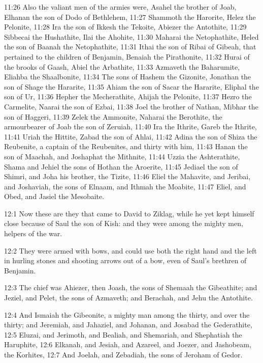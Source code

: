 11:26 Also the valiant men of the armies were, Asahel the brother of Joab, Elhanan the son of Dodo of Bethlehem, 11:27 Shammoth the Harorite, Helez the Pelonite, 11:28 Ira the son of Ikkesh the Tekoite, Abiezer the Antothite, 11:29 Sibbecai the Hushathite, Ilai the Ahohite, 11:30 Maharai the Netophathite, Heled the son of Baanah the Netophathite, 11:31 Ithai the son of Ribai of Gibeah, that pertained to the children of Benjamin, Benaiah the Pirathonite, 11:32 Hurai of the brooks of Gaash, Abiel the Arbathite, 11:33 Azmaveth the Baharumite, Eliahba the Shaalbonite, 11:34 The sons of Hashem the Gizonite, Jonathan the son of Shage the Hararite, 11:35 Ahiam the son of Sacar the Hararite, Eliphal the son of Ur, 11:36 Hepher the Mecherathite, Ahijah the Pelonite, 11:37 Hezro the Carmelite, Naarai the son of Ezbai, 11:38 Joel the brother of Nathan, Mibhar the son of Haggeri, 11:39 Zelek the Ammonite, Naharai the Berothite, the armourbearer of Joab the son of Zeruiah, 11:40 Ira the Ithrite, Gareb the Ithrite, 11:41 Uriah the Hittite, Zabad the son of Ahlai, 11:42 Adina the son of Shiza the Reubenite, a captain of the Reubenites, and thirty with him, 11:43 Hanan the son of Maachah, and Joshaphat the Mithnite, 11:44 Uzzia the Ashterathite, Shama and Jehiel the sons of Hothan the Aroerite, 11:45 Jediael the son of Shimri, and Joha his brother, the Tizite, 11:46 Eliel the Mahavite, and Jeribai, and Joshaviah, the sons of Elnaam, and Ithmah the Moabite, 11:47 Eliel, and Obed, and Jasiel the Mesobaite.

12:1 Now these are they that came to David to Ziklag, while he yet kept himself close because of Saul the son of Kish: and they were among the mighty men, helpers of the war.

12:2 They were armed with bows, and could use both the right hand and the left in hurling stones and shooting arrows out of a bow, even of Saul's brethren of Benjamin.

12:3 The chief was Ahiezer, then Joash, the sons of Shemaah the Gibeathite; and Jeziel, and Pelet, the sons of Azmaveth; and Berachah, and Jehu the Antothite.

12:4 And Ismaiah the Gibeonite, a mighty man among the thirty, and over the thirty; and Jeremiah, and Jahaziel, and Johanan, and Josabad the Gederathite, 12:5 Eluzai, and Jerimoth, and Bealiah, and Shemariah, and Shephatiah the Haruphite, 12:6 Elkanah, and Jesiah, and Azareel, and Joezer, and Jashobeam, the Korhites, 12:7 And Joelah, and Zebadiah, the sons of Jeroham of Gedor.

